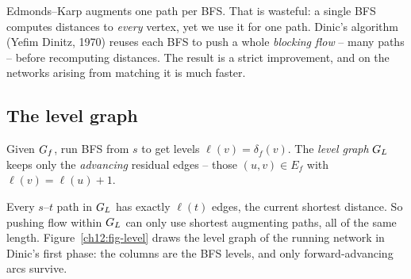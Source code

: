 Edmonds--Karp augments one path per BFS. That is wasteful: a single BFS computes
distances to \emph{every} vertex, yet we use it for one path. Dinic's algorithm
(Yefim Dinitz, 1970) reuses each BFS to push a whole \emph{blocking flow} -- many
paths -- before recomputing distances. The result is a strict improvement, and on
the networks arising from matching it is much faster.

\subsection{The level graph}

\begin{definition}
\label{ch12:def-level}
Given $G_f$, run BFS from $s$ to get levels $\ell(v)=\delta_f(v)$. The
\emph{level graph} $G_L$ keeps only the \emph{advancing} residual edges -- those
$(u,v)\in E_f$ with $\ell(v)=\ell(u)+1$.
\end{definition}

Every $s$--$t$ path in $G_L$ has exactly $\ell(t)$ edges, the current shortest
distance. So pushing flow within $G_L$ can only use shortest augmenting paths,
all of the same length. Figure~\ref{ch12:fig-level} draws the level graph of the
running network in Dinic's first phase: the columns are the BFS levels, and only
forward-advancing arcs survive.

